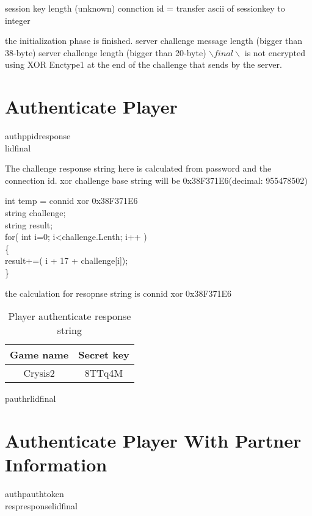 \documentclass[oneside,titlepage,a4paper]{Definition/retrospy} %
\begin{document}
session key length (unknown)
connction id = transfer ascii of sessionkey to integer

the initialization phase is finished.
server challenge message length (bigger than 38-byte)
server challenge length (bigger than 20-byte)
$ \backslash final \backslash $ is not encrypted using XOR Enctype1 at the end of the challenge that sends by the server.

\section{Authenticate Player}

\ClientRequest

\begin{mybox}
\tbs authp\tbs\tbs pid\tbs response\\
\tbs lid\tbs final\tbs
\end{mybox}
The challenge response string here is calculated from password and the connection id.
xor challenge base string will be 0x38F371E6(decimal: 955478502)
\begin{mybox}
int temp = connid xor 0x38F371E6\\
string challenge;\\
string result;\\
for( int i=0; i<challenge.Lenth; i++ )\\
\{\\
	result+=( i + 17 + challenge[i]);\\
\}
\end{mybox}
the calculation for resopnse string is connid xor 0x38F371E6
\begin{table}[H]
	\centering
	\begin{tabular}{|c|c|}
		\hline
		\textbf{Game name}&\textbf{Secret key}\\\hline
		Crysis2&8TTq4M\\\hline
	\end{tabular}
	\caption{Player authenticate response string}
	\label{Player authenticate response string}
\end{table}

\ServerResponse

\begin{mybox}[label = gstats player auth server response]
	\tbs pauthr\tbs <profile id>\tbs lid\tbs <local id>\tbs final\tbs
\end{mybox}

\section{Authenticate Player With Partner Information}
\ClientRequest
\begin{mybox}
	\tbs authp\tbs\tbs authtoken\tbs<authtoken string>\\\tbs resp\tbs response\tbs<response string>\tbs lid\tbs <local id>\tbs final\tbs
\end{mybox}
\ServerResponse
\end{document}
